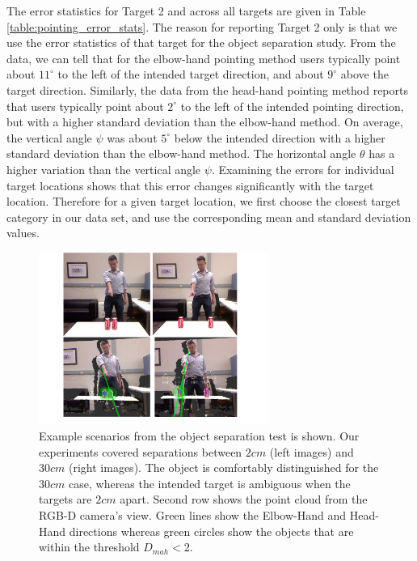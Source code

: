 \documentclass{tADR2e}
\begin{document}
The error statistics for Target 2 and across all targets are given in Table \ref{table:pointing_error_stats}. The reason for reporting Target 2 only is that we use the error statistics of that target for the object separation study. From the data, we can tell that for the elbow-hand pointing method users typically point about $11^\circ$ to the left of the intended target direction, and about $9^\circ$ above the target direction. Similarly, the data from the head-hand pointing method reports that users typically point about $2^\circ$ to the left of the intended pointing direction, but with a higher standard deviation than the elbow-hand method.  On average, the vertical angle $\psi$ was about $5^\circ$ below the intended direction with a higher standard deviation than the elbow-hand method. The horizontal angle $\theta$ has a higher variation than the vertical angle $\psi$.  Examining the errors for individual target locations shows that this error changes significantly with the target location. Therefore for a given target location, we first choose the closest target category in our data set, and use the corresponding mean and standard deviation values.


\begin{figure}[ht!]
\centering
\includegraphics[width=75mm]{pics/separation_2_cropped}
\caption{Example scenarios from the object separation test is shown. Our experiments covered separations between $2cm$ (left images) and $30cm$ (right images). The object is comfortably distinguished for the $30cm$ case, whereas the intended target is ambiguous when the targets are $2cm$ apart. Second row shows the point cloud from the RGB-D camera's view. Green lines show the Elbow-Hand and Head-Hand directions whereas green circles show the objects that are within the threshold $D_{mah}<2$.}
\label{fig:separation}
\end{figure}
\end{document}
